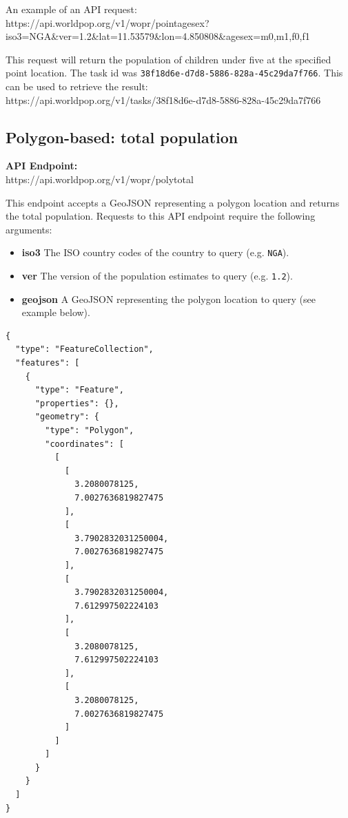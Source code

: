 \documentclass[]{book}
\begin{document}
An example of an API request:\\
https://api.worldpop.org/v1/wopr/pointagesex?iso3=NGA\&ver=1.2\&lat=11.53579\&lon=4.850808\&agesex=m0,m1,f0,f1

This request will return the population of children under five at the
specified point location. The task id was
\texttt{38f18d6e-d7d8-5886-828a-45c29da7f766}. This can be used to
retrieve the result:\\
https://api.worldpop.org/v1/tasks/38f18d6e-d7d8-5886-828a-45c29da7f766

\subsection{Polygon-based: total
population}\label{polygon-based-total-population}

\textbf{API Endpoint:}\\
https://api.worldpop.org/v1/wopr/polytotal

This endpoint accepts a GeoJSON representing a polygon location and
returns the total population. Requests to this API endpoint require the
following arguments:

\begin{itemize}
\item
  \textbf{iso3} The ISO country codes of the country to query (e.g.
  \texttt{NGA}).
\item
  \textbf{ver} The version of the population estimates to query (e.g.
  \texttt{1.2}).
\item
  \textbf{geojson} A GeoJSON representing the polygon location to query
  (see example below).
\end{itemize}

\begin{verbatim}
{
  "type": "FeatureCollection",
  "features": [
    {
      "type": "Feature",
      "properties": {},
      "geometry": {
        "type": "Polygon",
        "coordinates": [
          [
            [
              3.2080078125,
              7.0027636819827475
            ],
            [
              3.7902832031250004,
              7.0027636819827475
            ],
            [
              3.7902832031250004,
              7.612997502224103
            ],
            [
              3.2080078125,
              7.612997502224103
            ],
            [
              3.2080078125,
              7.0027636819827475
            ]
          ]
        ]
      }
    }
  ]
}
\end{verbatim}
\end{document}
